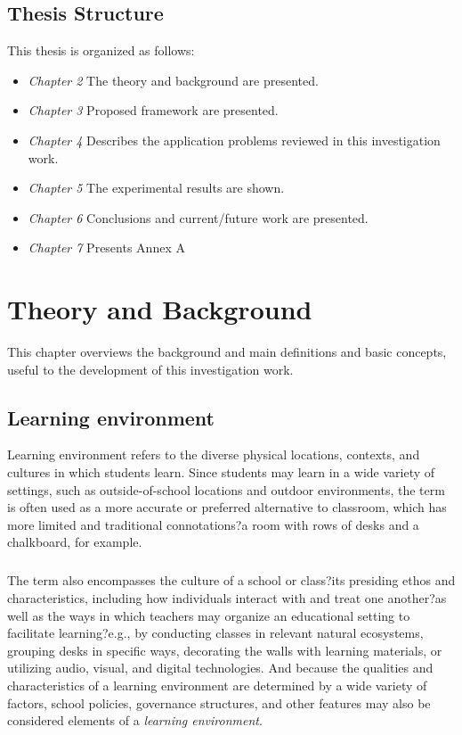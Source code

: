 \documentclass[12pt,letterpaper,oneside] {memoir}
\begin{document}
\paragraph{}
\section{Thesis Structure}
This thesis is organized as follows:
\begin{itemize}
\item \textit{Chapter 2} The theory and background are presented.
\item \textit{Chapter 3} Proposed framework are presented. 
\item \textit{Chapter 4} Describes the application problems reviewed in this investigation work.
\item \textit{Chapter 5} The experimental results are shown.
\item \textit{Chapter 6} Conclusions and current/future work are presented.
\item \textit{Chapter 7} Presents Annex A
\end{itemize}
\chapter{Theory and Background}
This chapter overviews the background and main definitions and basic concepts, useful to the development of this investigation work.
\paragraph{} 
\section{Learning environment}
Learning environment refers to the diverse physical locations, contexts, and cultures in which students learn. Since students may learn in a wide variety of settings, such as outside-of-school locations and outdoor environments, the term is often used as a more accurate or preferred alternative to classroom, which has more limited and traditional connotations?a room with rows of desks and a chalkboard, for example.
\paragraph{}
The term also encompasses the culture of a school or class?its presiding ethos and characteristics, including how individuals interact with and treat one another?as well as the ways in which teachers may organize an educational setting to facilitate learning?e.g., by conducting classes in relevant natural ecosystems, grouping desks in specific ways, decorating the walls with learning materials, or utilizing audio, visual, and digital technologies. And because the qualities and characteristics of a learning environment are determined by a wide variety of factors, school policies, governance structures, and other features may also be considered elements of a  \textit{learning environment}.
\end{document}
